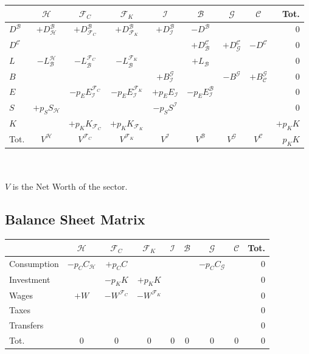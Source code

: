 \documentclass[a4paper, headings=standardclasses]{scrartcl}
\begin{document}
\begin{tabular}{l|ccccccc|r}
	\toprule
	& $\mathcal{H}$ & $\mathcal{F}_C$ & $\mathcal{F}_K$ & $\mathcal{I}$ & $\mathcal{B}$ & $\mathcal{G}$ & $\mathcal{C}$ & Tot. \\
	\midrule
	$D^\mathcal{B}$ & $+D^\mathcal{B}_\mathcal{H}$ & $+D^\mathcal{B}_{\mathcal{F}_C}$ & $+D^\mathcal{B}_{\mathcal{F}_K}$ &  $+D^\mathcal{B}_\mathcal{I}$  &  $-D^\mathcal{B}$ & & & 0 \\
	$D^\mathcal{C}$ & & & & & $+D^\mathcal{C}_\mathcal{B}$ & $+D^\mathcal{C}_\mathcal{G}$ & $-D^\mathcal{C}$ & 0 \\
	$L$ & $-L^\mathcal{H}_\mathcal{B}$ & $-L^{\mathcal{F}_C}_\mathcal{B}$ & $-L^{\mathcal{F}_K}_\mathcal{B}$ & & $+L_\mathcal{B}$ & & & 0 \\
	$B$ & & & & $+B^\mathcal{G}_\mathcal{I}$ & & $-B^\mathcal{G}$ & $+B^\mathcal{G}_\mathcal{C}$ & 0 \\
	$E$ & & $-p_E E^{\mathcal{F}_C}_\mathcal{I}$ & $-p_E E^{\mathcal{F}_K}_\mathcal{I}$ & $+p_E E_\mathcal{I}$ & $-p_E E^\mathcal{B}_\mathcal{I}$ & & & 0 \\
	$S$ & $+p_S S_\mathcal{H}$ & & & $-p_S S^\mathcal{I}$ & & & & 0 \\
	$K$ & & $+p_K K_{\mathcal{F}_C}$ & $+p_K K_{\mathcal{F}_K}$ & & & & & $+p_K K$\\
	\midrule
	Tot. & $V^\mathcal{H}$ & $V^{\mathcal{F}_C}$ & $V^{\mathcal{F}_K}$ & $V^\mathcal{I}$ & $V^\mathcal{B}$ & $V^\mathcal{G}$ & $V^\mathcal{C}$ & $p_K K$\\
	\bottomrule
\end{tabular}
\\ \\ 
\vspace{1em}
$V$ is the Net Worth of the sector.

\subsection{Balance Sheet Matrix}

\begin{tabular}{l|ccccccc|r}
	\toprule
	& $\mathcal{H}$ & $\mathcal{F}_C$ & $\mathcal{F}_K$ & $\mathcal{I}$ & $\mathcal{B}$ & $\mathcal{G}$ & $\mathcal{C}$ & Tot. \\
	\midrule
	Consumption & $-p_C C_\mathcal{H}$ & $+p_C C$ & & & & $-p_C C_\mathcal{G}$ & & 0 \\
	Investment & & $-p_K K$ & $+p_K K$ & & & & & 0 \\
	Wages & $+W$ & $-W^{\mathcal{F}_C}$ & $-W^{\mathcal{F}_K}$ & & & & & 0 \\
	Taxes & & & & & & & & 0 \\
	Transfers & & & & & & & & 0 \\
	\midrule
	Tot. & 0 & 0 & 0 & 0 & 0 & 0 & 0 & 0 \\
	\bottomrule
\end{tabular}
\\ \\ 
\vspace{1em}
\end{document}
